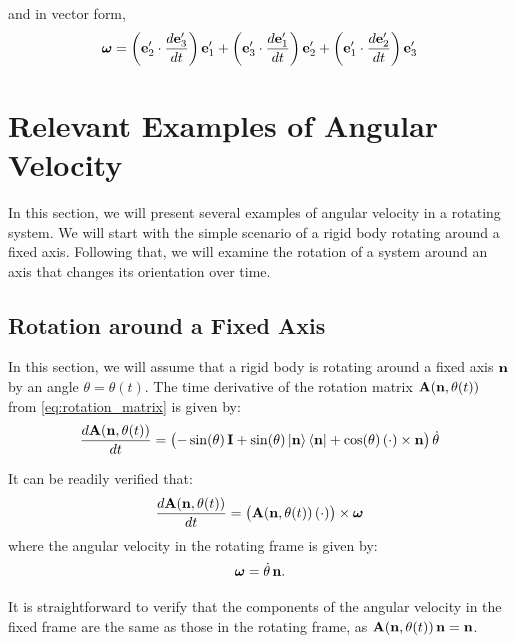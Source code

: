 \documentclass[12pt]{article}
\begin{document}
and in vector form,
\begin{equation}
  \boldsymbol{\omega} =
    \left(\vb{e}'_2 \cdot \frac{d\vb{e}'_3}{dt}\right)\vb{e}'_1
  + \left(\vb{e}'_3 \cdot \frac{d\vb{e}'_1}{dt}\right)\vb{e}'_2
  + \left(\vb{e}'_1 \cdot \frac{d\vb{e}'_2}{dt}\right)\vb{e}'_3
  \label{eq:angular_velocity_components}
\end{equation}

\section{Relevant Examples of Angular Velocity}

In this section, we will present several examples of angular velocity in a rotating system.
We will start with the simple scenario of a rigid body rotating around a fixed axis. Following
that, we will examine the rotation of a system around an axis that changes its orientation
over time.

\subsection{Rotation around a Fixed Axis}

In this section, we will assume that a rigid body is rotating around a fixed axis $\vb{n}$
by an angle $\theta = \theta(t)$. The time derivative of the rotation matrix
$\vb{A}(\vb{n}, \theta(t))$ from \eqref{eq:rotation_matrix} is given by:
\begin{equation}
  \frac{d\vb{A}(\vb{n},\theta(t))}{dt} =
  \bigl(-\sin(\theta)\,\vb{I} + \sin(\theta)\ket{\vb{n}}\bra{\vb{n}} + \cos(\theta)\,(\cdot)\times\vb{n}\bigr)\,\dot\theta
\end{equation}

It can be readily verified that:
\begin{equation}
  \frac{d\vb{A}(\vb{n},\theta(t))}{dt} = \bigl(\vb{A}(\vb{n},\theta(t))\,(\cdot)\bigr) \times \boldsymbol{\omega}
\end{equation}
where the angular velocity in the rotating frame is given by:
\begin{equation}
  \boldsymbol{\omega} = \dot\theta\,\vb{n}.
  \label{eq:angular_velocity_fixed}
\end{equation}

It is straightforward to verify that the components of the angular velocity in the fixed
frame are the same as those in the rotating frame, as
$\vb{A}(\vb{n},\theta(t))\,\vb{n} = \vb{n}$.
\end{document}
